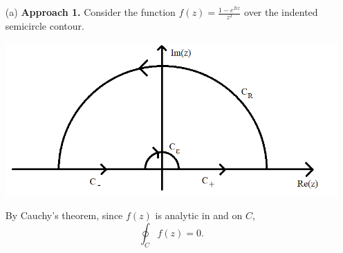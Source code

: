 \documentclass{article}
\begin{document}
\begin{itemize}
    \item[(a)] \textbf{Approach 1.} Consider the function $f(z) = \frac{1 - e^{2iz}}{z^2}$ over the indented semicircle contour. 

    \begin{center}
        \includegraphics[scale = 0.4]{contour1.PNG}
    \end{center}
    By Cauchy's theorem, since $f(z)$ is analytic in and on $C$,
    \[\oint_Cf(z) = 0.\]
    

\end{itemize}
\end{document}
